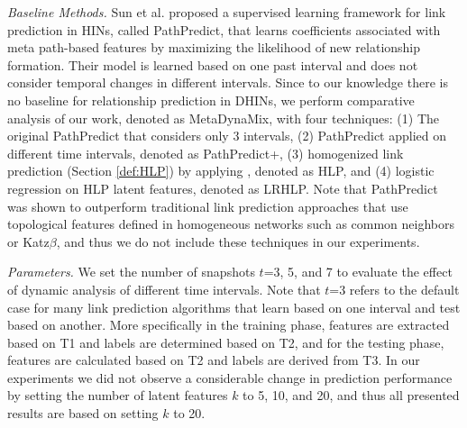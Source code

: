 



\textit{Baseline Methods.} Sun et al. \cite{sun2011ASONAM} proposed a supervised learning framework for link prediction in HINs, called {PathPredict}, that learns coefficients associated with meta path-based features by maximizing the likelihood of new relationship formation. Their model is learned based on one past interval and does not consider temporal changes in different intervals. Since to our knowledge there is no baseline for relationship prediction in DHINs, we perform comparative analysis of our work, denoted as {MetaDynaMix}, with four techniques: (1) The original {PathPredict} \cite{sun2011ASONAM} that considers only 3 intervals, (2) PathPredict applied on different time intervals, denoted as {PathPredict+}, (3) homogenized link prediction (Section \ref{def:HLP}) by applying \cite{Zhu2016}, denoted as {HLP}, and (4) logistic regression on HLP latent features, denoted as {LRHLP}. %
Note that {PathPredict} \cite{sun2011ASONAM} was shown to outperform traditional link prediction approaches that use topological features defined in homogeneous networks such as common neighbors or Katz$\beta$, and thus we do not include these techniques in our experiments.




\textit{Parameters.} We set the number of snapshots $t$=3, 5, and 7 to evaluate the effect of dynamic analysis of different time intervals. Note that $t$=3 refers to the default case for many link prediction algorithms that learn based on one interval and test based on another. More specifically in the training phase, features are extracted based on T1 and labels are determined based on T2, and for the testing phase, features are calculated based on T2 and labels are derived from T3. In our experiments we did not observe a considerable change in prediction performance by setting the number of latent features $k$ to 5, 10, and 20, and thus all presented results are based on setting $k$ to 20. %

